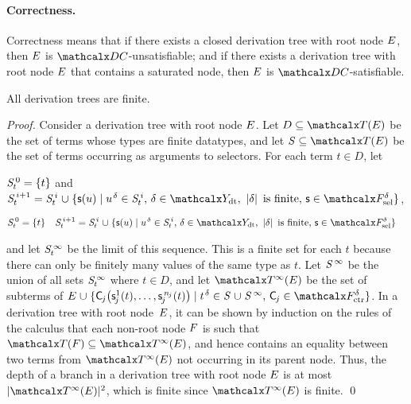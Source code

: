 \paragraph{Correctness.}
Correctness means that if there exists a closed derivation tree with root node
$E$, then $E$ is $\thD$-unsatisfiable; and if there exists
a derivation tree with root node $E$ that contains a saturated node, then
$E$ is $\thD$-satisfiable.

\begin{theorem}[Termination]%
\label{thm:t}%
\afterDot
All derivation trees are finite.
\end{theorem}
\begin{proof}
Consider a derivation tree with root node $E$. Let $D \subseteq \tEc$ be the
set of terms whose types are finite datatypes, and let $\SSS \subseteq \tEc$ be
the set of terms occurring as arguments to selectors. For each term $t \in
D$\negvthinspace, let
\begin{conf}
$\smash{\mathit{S}^{\,0}_t} = \{ t \}$ and
$\smash{\SSSS {i+1}_t} = \smash{\SSSS i_t \mathrel\cup \{ \const s( u ) \mid u\typ{\delta} \in \SSSS i_t{,}}~\allowbreak\smash{ \delta \in \Data{,}~ \left|\delta\right| \text{ is finite}{,}~ \const{s} \in \Sel^{\delta}}  \}$,
\end{conf}%
\begin{rep}
\begin{align*}
\smash{\SSSS 0_t} & = \{ t \}
& \smash{\SSSS {i+1}_t} & = \smash{\SSSS i_t \mathrel\cup \{ \const s( u ) \mid u\typ{\delta} \in \SSSS i_t{,}~ \delta \in \Data{,}~ \left|\delta\right| \text{ is finite}{,}~ \const{s} \in \Sel^{\delta}}  \}
\end{align*}
\end{rep}%
and let $\mathit{S}^{\,\infty}_t$ be the limit of this sequence.
This is a finite set for each $t$ because there can only be finitely many
values of the same type as $t$.
Let $\mathit{S}^{\,\infty}$ be the union of all sets $\mathit{S}^{\,\infty}_t$ where $t \in D$,
and let $\tcEc$ be the set of subterms of
%
$\Ec \mathrel\cup \{ \const C_{\negvthinspace j}\bigl( \const s^1_{\negvthinspace j}( t ), \ldots, \const s^{\smash{\,n_{\negvthinspace j}}}_{\negvthinspace j}( t ) \bigr) \mid t\typ{\delta} \in \SSS \mathrel\cup \SSSS \AST{,}~ \const C_{\negvthinspace j} \in \Ctr^\delta \}$.
%
In a derivation tree with root node~$E$,
it can be shown by %
induction on the rules of the calculus that each non-root node $F$ is such that
$\Terms(\Fc) \subseteq \tcEc$, and hence contains an equality between two terms from $\tcEc$ not occurring in its parent node.
Thus, the depth of a branch in a derivation tree with root node $E$ is at most $\left| \smash{\tcEc}\vphantom{X} \right|{\!}^2$,
which is finite since $\tcEc$ is finite.
\qed
\end{proof}

